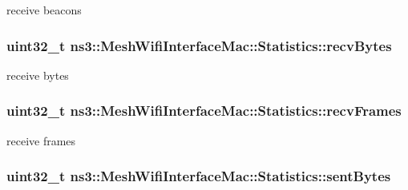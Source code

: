 receive beacons 

\subsubsection[{\texorpdfstring{recv\+Bytes}{recvBytes}}]{\setlength{\rightskip}{0pt plus 5cm}uint32\+\_\+t ns3\+::\+Mesh\+Wifi\+Interface\+Mac\+::\+Statistics\+::recv\+Bytes}\hypertarget{structns3_1_1MeshWifiInterfaceMac_1_1Statistics_a1212fbc4174106637d4baa66bccecae7}{}\label{structns3_1_1MeshWifiInterfaceMac_1_1Statistics_a1212fbc4174106637d4baa66bccecae7}


receive bytes 

\subsubsection[{\texorpdfstring{recv\+Frames}{recvFrames}}]{\setlength{\rightskip}{0pt plus 5cm}uint32\+\_\+t ns3\+::\+Mesh\+Wifi\+Interface\+Mac\+::\+Statistics\+::recv\+Frames}\hypertarget{structns3_1_1MeshWifiInterfaceMac_1_1Statistics_a5c415eaaf3b19754785b520741d1cb2b}{}\label{structns3_1_1MeshWifiInterfaceMac_1_1Statistics_a5c415eaaf3b19754785b520741d1cb2b}


receive frames 

\subsubsection[{\texorpdfstring{sent\+Bytes}{sentBytes}}]{\setlength{\rightskip}{0pt plus 5cm}uint32\+\_\+t ns3\+::\+Mesh\+Wifi\+Interface\+Mac\+::\+Statistics\+::sent\+Bytes}\hypertarget{structns3_1_1MeshWifiInterfaceMac_1_1Statistics_a3355f31cf6a746c97c0fedba7bfdba43}{}\label{structns3_1_1MeshWifiInterfaceMac_1_1Statistics_a3355f31cf6a746c97c0fedba7bfdba43}



